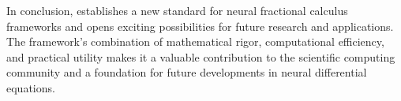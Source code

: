 In conclusion, \hpfracc establishes a new standard for neural fractional calculus frameworks and opens exciting possibilities for future research and applications. The framework's combination of mathematical rigor, computational efficiency, and practical utility makes it a valuable contribution to the scientific computing community and a foundation for future developments in neural differential equations.
